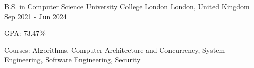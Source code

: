 
\begin{cventries}

  \cventry
    {B.S. in Computer Science} %
    {University College London} %
    {London, United Kingdom} %
    {Sep 2021 - Jun 2024} %
    {
      \begin{cvitems} %
        \item {GPA: 73.47\%}
        \item {Courses: Algorithms, Computer Architecture and Concurrency, System Engineering, Software Engineering, Security}
      \end{cvitems}
    }

\end{cventries}
